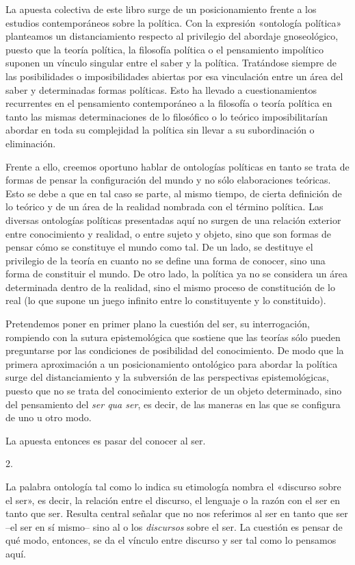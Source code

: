 La apuesta colectiva de este libro surge de un posicionamiento frente a los estudios contemporáneos sobre la política. Con la expresión «ontología política» planteamos un distanciamiento respecto al privilegio del abordaje gnoseológico, puesto que la teoría política, la filosofía política o el pensamiento impolítico suponen un vínculo singular entre el saber y la política. Tratándose siempre de las posibilidades o imposibilidades abiertas por esa vinculación entre un área del saber y determinadas formas políticas. Esto ha llevado a cuestionamientos recurrentes en el pensamiento contemporáneo a la filosofía o teoría política en tanto las mismas determinaciones de lo filosófico o lo teórico imposibilitarían abordar en toda su complejidad la política sin llevar a su subordinación o eliminación.

Frente a ello, creemos oportuno hablar de ontologías políticas en tanto se trata de formas de pensar la configuración del mundo y no sólo elaboraciones teóricas. Esto se debe a que en tal caso se parte, al mismo tiempo, de cierta definición de lo teórico y de un área de la realidad nombrada con el término política. Las diversas ontologías políticas presentadas aquí no surgen de una relación exterior entre conocimiento y realidad, o entre sujeto y objeto, sino que son formas de pensar cómo se constituye el mundo como tal. De un lado, se destituye el privilegio de la teoría en cuanto no se define una forma de conocer, sino una forma de constituir el mundo. De otro lado, la política ya no se considera un área determinada dentro de la realidad, sino el mismo proceso de constitución de lo real (lo que supone un juego infinito entre lo constituyente y lo constituido).

Pretendemos poner en primer plano la cuestión del ser, su interrogación, rompiendo con la sutura epistemológica que sostiene que las teorías sólo pueden preguntarse por las condiciones de posibilidad del conocimiento. De modo que la primera aproximación a un posicionamiento ontológico para abordar la política surge del distanciamiento y la subversión de las perspectivas epistemológicas, puesto que no se trata del conocimiento exterior de un objeto determinado, sino del pensamiento del \emph{ser qua ser}, es decir, de las maneras en las que se configura de uno u otro modo.

La apuesta entonces es pasar del conocer al ser.

2.

La palabra ontología tal como lo indica su etimología nombra el «discurso sobre el ser», es decir, la relación entre el discurso, el lenguaje o la razón con el ser en tanto que ser. Resulta central señalar que no nos referimos al ser en tanto que ser --el ser en sí mismo-- sino al o los \emph{discursos} sobre el ser. La cuestión es pensar de qué modo, entonces, se da el vínculo entre discurso y ser tal como lo pensamos aquí.

